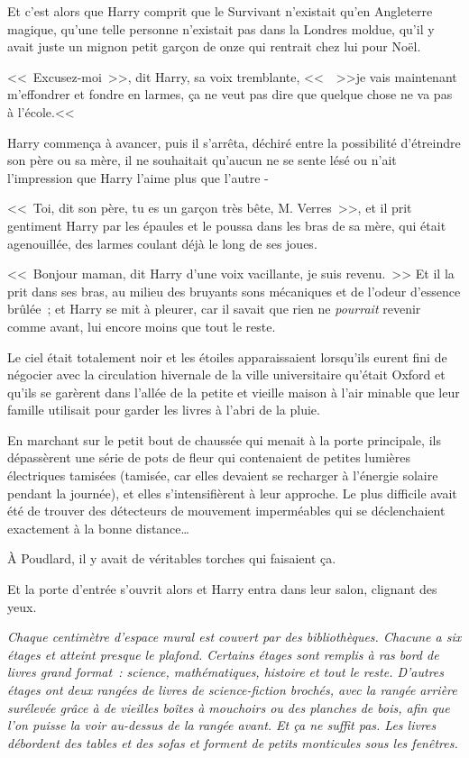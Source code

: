 Et c'est alors que Harry comprit que le Survivant n'existait qu'en Angleterre magique, qu'une telle personne n'existait pas dans la Londres moldue, qu'il y avait juste un mignon petit garçon de onze qui rentrait chez lui pour Noël.

<<~Excusez-moi~>>, dit Harry, sa voix tremblante, <<~~>>je vais maintenant m'effondrer et fondre en larmes, ça ne veut pas dire que quelque chose ne va pas à l'école.<<~

Harry commença à avancer, puis il s'arrêta, déchiré entre la possibilité d'étreindre son père ou sa mère, il ne souhaitait qu'aucun ne se sente lésé ou n'ait l'impression que Harry l'aime plus que l'autre -

<<~Toi, dit son père, tu es un garçon très bête, M. Verres~>>, et il prit gentiment Harry par les épaules et le poussa dans les bras de sa mère, qui était agenouillée, des larmes coulant déjà le long de ses joues.

<<~Bonjour maman, dit Harry d'une voix vacillante, je suis revenu.~>> Et il la prit dans ses bras, au milieu des bruyants sons mécaniques et de l'odeur d'essence brûlée~; et Harry se mit à pleurer, car il savait que rien ne \emph{pourrait} revenir comme avant, lui encore moins que tout le reste.

\later

Le ciel était totalement noir et les étoiles apparaissaient lorsqu'ils eurent fini de négocier avec la circulation hivernale de la ville universitaire qu'était Oxford et qu'ils se garèrent dans l'allée de la petite et vieille maison à l'air minable que leur famille utilisait pour garder les livres à l'abri de la pluie.

En marchant sur le petit bout de chaussée qui menait à la porte principale, ils dépassèrent une série de pots de fleur qui contenaient de petites lumières électriques tamisées (tamisée, car elles devaient se recharger à l'énergie solaire pendant la journée), et elles s'intensifièrent à leur approche. Le plus difficile avait été de trouver des détecteurs de mouvement imperméables qui se déclenchaient exactement à la bonne distance…

À Poudlard, il y avait de véritables torches qui faisaient ça.

Et la porte d'entrée s'ouvrit alors et Harry entra dans leur salon, clignant des yeux.

\emph{Chaque centimètre d'espace mural est couvert par des bibliothèques. Chacune a six étages et atteint presque le plafond. Certains étages sont remplis à ras bord de livres grand format~: science, mathématiques, histoire et tout le reste. D'autres étages ont deux rangées de livres de science-fiction brochés, avec la rangée arrière surélevée grâce à de vieilles boîtes à mouchoirs ou des planches de bois, afin que l'on puisse la voir au-dessus de la rangée avant. Et ça ne suffit pas. Les livres débordent des tables et des sofas et forment de petits monticules sous les fenêtres.}

